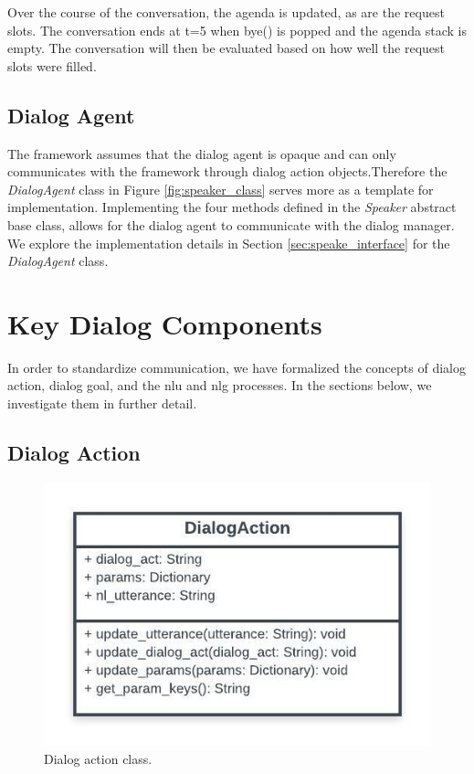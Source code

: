 Over the course of the conversation, the agenda is updated, as are the request slots. The conversation ends at t=5 when bye() is popped and the agenda stack is empty. The conversation will then be evaluated based on how well the request slots were filled.

\subsection{Dialog Agent}
The framework assumes that the dialog agent is opaque and can only communicates with the framework through dialog action objects.Therefore the \textit{DialogAgent} class in Figure \ref{fig:speaker_class} serves more as a template for implementation. Implementing the four methods defined in the \textit{Speaker} abstract base class, allows for the dialog agent to communicate with the dialog manager. We explore the implementation details in Section \ref{sec:speake_interface} for the \textit{DialogAgent} class.

\section{Key Dialog Components}
In order to standardize communication, we have formalized the concepts of dialog action, dialog goal, and the nlu and nlg processes. In the sections below, we investigate them in further detail.

\subsection{Dialog Action}
\label{sssec:dialog_action}

\begin{figure}[h!]
	\centering
	\includegraphics[scale=1]{diagrams/dialog_action.jpeg}
	\caption{ Dialog action class. }
	\label{fig:dialog_action_class}
\end{figure}

